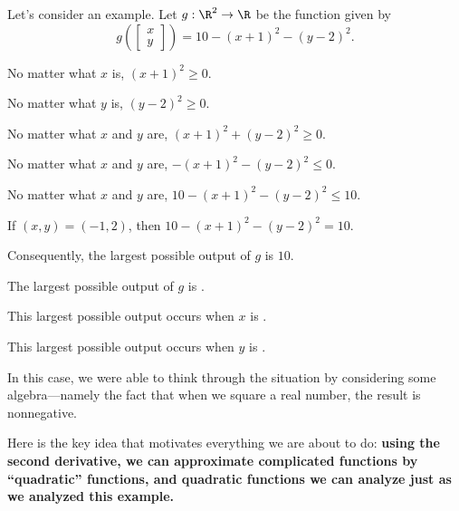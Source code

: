 \documentclass{ximera}
\begin{document}
\begin{question}
  Let's consider an example.  Let $g : \R^2 \to \R$ be the function given by
  $$
  g \left( \begin{bmatrix} x \\ y \end{bmatrix} \right) = 10 - (x+1)^2 - (y-2)^2.
  $$  

  \begin{solution}
    \begin{hint}
      No matter what $x$ is, $(x+1)^2 \geq 0$.
    \end{hint}

    \begin{hint}
      No matter what $y$ is, $(y-2)^2 \geq 0$.
    \end{hint}

    \begin{hint}
      No matter what $x$ and $y$ are, $(x+1)^2 + (y-2)^2 \geq 0$.
    \end{hint}

    \begin{hint}
      No matter what $x$ and $y$ are, $- (x+1)^2 - (y-2)^2 \leq 0$.
    \end{hint}

    \begin{hint}
      No matter what $x$ and $y$ are, $10 - (x+1)^2 - (y-2)^2 \leq 10$.
    \end{hint}

    \begin{hint}
      If $(x,y) = (-1,2)$, then $10 - (x+1)^2 - (y-2)^2 = 10$.
    \end{hint}

    \begin{hint}
      Consequently, the largest possible output of $g$ is $10$.
    \end{hint}

    The largest possible output of $g$ is .
  \end{solution}

  \begin{solution}
    This largest possible output occurs when $x$ is .
  \end{solution}

  \begin{solution}
    This largest possible output occurs when $y$ is .
  \end{solution}

  In this case, we were able to think through the situation by
  considering some algebra---namely the fact that when we square a
  real number, the result is nonnegative.

  Here is the key idea that motivates everything we are about to do:
  \textbf{using the second derivative, we can approximate complicated
    functions by ``quadratic'' functions, and quadratic functions we
    can analyze just as we analyzed this example.}

\end{question}
\end{document}
